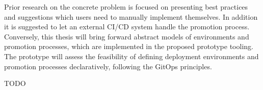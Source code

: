 Prior research on the concrete problem is focused on presenting
best practices and suggestions
which users need to manually implement themselves.
In addition it is suggested to let an external CI/CD system handle the promotion process.
Conversely, this thesis will bring forward
abstract models of environments and promotion processes,
which are implemented in the proposed prototype tooling.
The prototype will assess the feasibility of
defining deployment environments and promotion processes declaratively,
following the GitOps principles.

TODO



























%
%
%
%
%
%
%
%






